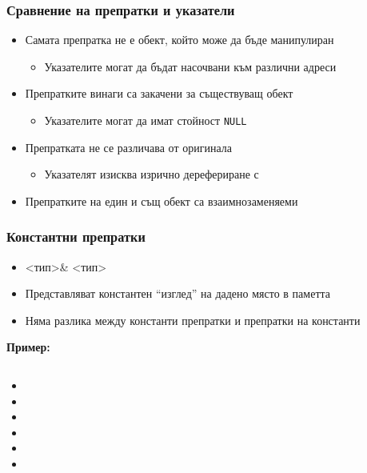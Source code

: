\documentclass{beamer}
\begin{document}
\begin{frame}
  \frametitle{Сравнение на препратки и указатели}

  \begin{itemize}[<+->]
  \item Самата препратка не е обект, който може да бъде манипулиран
    \begin{itemize}
    \item Указателите могат да бъдат насочвани към различни адреси
    \end{itemize}
  \item Препратките винаги са закачени за съществуващ обект
    \begin{itemize}
    \item Указателите могат да имат стойност \tt{NULL}
    \end{itemize}
  \item Препратката не се различава от оригинала
    \begin{itemize}
    \item Указателят изисква изрично дерефериране с \tt*
    \end{itemize}
  \item Препратките на един и същ обект са взаимнозаменяеми
  \end{itemize}
\end{frame}

\begin{frame}
  \frametitle{Константни препратки}

  \begin{itemize}[<+->]
  \item {}<тип>\tta\& \eqv <тип>
  \item Представляват константен ``изглед'' на дадено място в паметта
  \item Няма разлика между константи препратки и препратки на константи
  \end{itemize}
  \onslide<+->
  \textbf{Пример:}
  \begin{columns}[T,onlytextwidth]
    \begin{column}{.5\textwidth}
      \begin{itemize}[<+->]
      \item {}
      \item {}
      \item {}
      \item {}
      \item {}
      \item {}
      \end{itemize}
    \end{column}
    \begin{column}{.5\textwidth}
    \end{column}
  \end{columns}
\end{frame}
\end{document}
